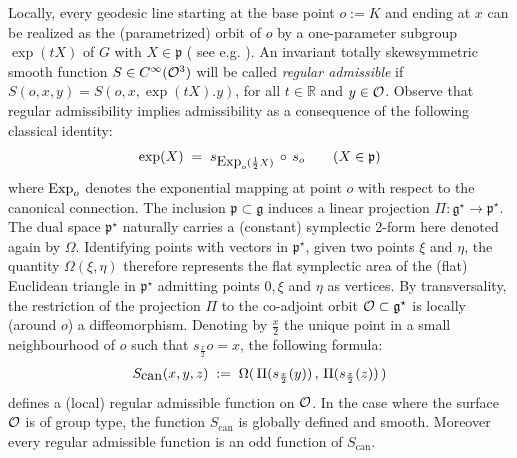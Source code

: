 \documentclass{article}
\newcommand{\R}{\mathbb R}
\renewcommand{\gg}{\mathfrak g}
\newcommand{\pp}{\mathfrak p}
\def\co{{\cal O}}
\def \R{{\mathbb R}}
\begin{document}
\noindent Locally, every geodesic line
starting at the base point $o:=K$ and ending at $x$ can be realized as the (parametrized) orbit of $o$ by a one-parameter 
subgroup $\exp(tX)$ of $G$ with $X\in\pp$ ( see e.g. \cite{helgason} ). An invariant totally skewsymmetric smooth function $S\in C^\infty(\co^3)$ will be called {\sl regular admissible } if $S(o,x,y)=S(o,x,\exp(tX).y)$,
for all $t\in\R$ and $y\in\co$. Observe that regular admissibility implies admissibility as a consequence of the
following classical identity:
\begin{equation}
\exp(X)\;=\;s_{\mbox{\rm Exp}_o(\frac{1}{2}X)}\,\circ\, s_o\qquad(X\in\pp)
\end{equation}
where $\mbox{\rm Exp}_o$ denotes the exponential mapping at point $o$ with respect to the 
canonical connection.
The inclusion $\pp\subset\gg$ induces a linear projection  $\Pi:\gg^\star\to\pp^\star$. The dual space
$\pp^\star$ naturally carries a (constant) symplectic 2-form here denoted again by $\Omega$. Identifying 
points with vectors in $\pp^\star$, given two points $\xi$ and $\eta$, the quantity $\Omega(\xi,\eta)$
therefore represents the flat symplectic area of the (flat) Euclidean triangle in $\pp^\star$ admitting
points $0,\xi$ and $\eta$ as vertices. By transversality, the restriction  of the projection $\Pi$ to 
the co-adjoint orbit $\co\subset\gg^\star$ is locally (around $o$) a diffeomorphism.  Denoting by $\frac{x}{2}$ the unique point in a small neighbourhood of $o$ such that $s_{\frac{x}{2}}o=x$,
the following formula:
\begin{equation*}
S_{\mbox{\rm can}}(x,y,z)\;:=\;\Omega(\,\Pi(s_{\frac{x}{2}}(y))\,,\,\Pi(s_{\frac{x}{2}}(z))\,)
\end{equation*}
defines a (local) regular admissible function on $\co$. In the case where the surface $\co$ is of group type, the function $S_{\mbox{can}}$ is globally defined and smooth. 
Moreover every regular admissible function is an odd function of $S_{\mbox{can}}$. 
\end{document}
